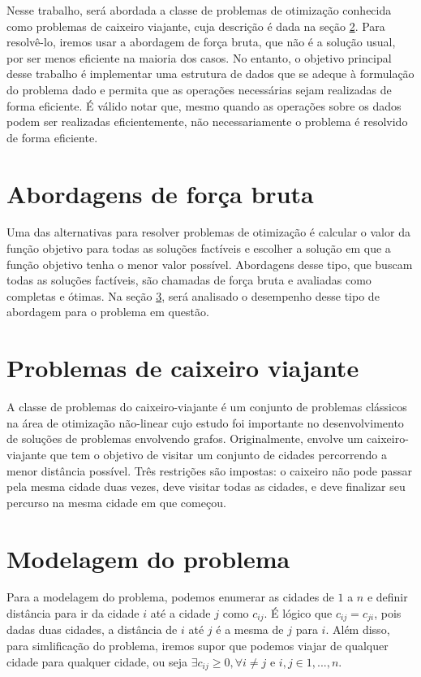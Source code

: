 \documentclass[a4paper, 12pt]{article} %
\begin{document}
	Nesse trabalho, será abordada a classe de problemas de otimização conhecida como problemas de caixeiro viajante, cuja descrição é dada na seção \ref{sec:description}. Para resolvê-lo, iremos usar a abordagem de força bruta, que não é a solução usual, por ser menos eficiente na maioria dos casos. No entanto, o objetivo principal desse trabalho é implementar uma estrutura de dados que se adeque à formulação do problema dado e permita que as operações necessárias sejam realizadas de forma eficiente. É válido notar que, mesmo quando as operações sobre os dados podem ser realizadas eficientemente, não necessariamente o problema é resolvido de forma eficiente.
		
	\section{Abordagens de força bruta}
	
	Uma das alternativas para resolver problemas de otimização é calcular o valor da função objetivo para todas as soluções factíveis e escolher a solução em que a função objetivo tenha o menor valor possível. Abordagens desse tipo, que buscam todas as soluções factíveis, são chamadas de força bruta e avaliadas como completas e ótimas. Na seção \ref{sec:modelagem}, será analisado o desempenho desse tipo de abordagem para o problema em questão.

	\section{Problemas de caixeiro viajante} \label{sec:description}
	A classe de problemas do caixeiro-viajante é um conjunto de problemas clássicos na área de otimização não-linear cujo estudo foi importante no desenvolvimento de soluções de problemas envolvendo grafos. Originalmente, envolve um caixeiro-viajante que tem o objetivo de visitar um conjunto de cidades percorrendo a menor distância possível. Três restrições são impostas: o caixeiro não pode passar pela mesma cidade duas vezes, deve visitar todas as cidades, e deve finalizar seu percurso na mesma cidade em que começou.
	
	\section{Modelagem do problema} \label{sec:modelagem}
	Para a modelagem do problema, podemos enumerar as cidades de $1$ a $n$ e definir distância para ir da cidade $i$ até a cidade $j$ como $c_{ij}$. É lógico que $c_{ij} = c_{ji}$, pois dadas duas cidades, a distância de $i$ até $j$ é a mesma de $j$ para $i$. Além disso, para simlificação do problema, iremos supor que podemos viajar de qualquer cidade para qualquer cidade, ou seja $\exists c_{ij} \geq 0, \forall i \neq j$ e $i,j \in {1, ..., n}$.
	
\end{document}
